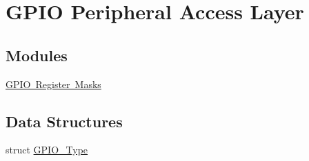 \hypertarget{group___g_p_i_o___peripheral___access___layer}{}\section{G\+P\+IO Peripheral Access Layer}
\label{group___g_p_i_o___peripheral___access___layer}
\subsection*{Modules}
\begin{DoxyCompactItemize}
\item 
\mbox{\hyperlink{group___g_p_i_o___register___masks}{G\+P\+I\+O Register Masks}}
\end{DoxyCompactItemize}
\subsection*{Data Structures}
\begin{DoxyCompactItemize}
\item 
struct \mbox{\hyperlink{struct_g_p_i_o___type}{G\+P\+I\+O\+\_\+\+Type}}
\end{DoxyCompactItemize}
